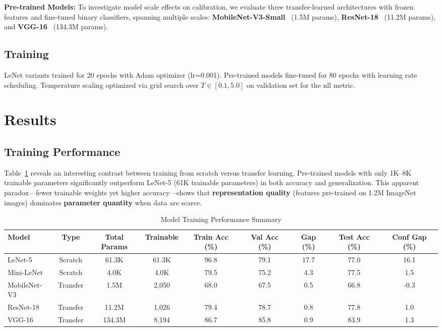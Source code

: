 \documentclass[10pt,twocolumn]{article}
\begin{document}
\textbf{Pre-trained Models:} To investigate model scale effects on calibration, we evaluate three transfer-learned architectures with frozen features and fine-tuned binary classifiers, spanning multiple scales: \textbf{MobileNet-V3-Small}~\cite{howard2019searching} (1.5M params), \textbf{ResNet-18}~\cite{he2016deep} (11.2M params), and \textbf{VGG-16}~\cite{simonyan2014very} (134.3M params).

\subsection{Training}
LeNet variants trained for 20 epochs with Adam optimizer (lr=0.001). Pre-trained models fine-tuned for 80 epochs with learning rate scheduling. Temperature scaling optimized via grid search over $T \in [0.1, 5.0]$ on validation set for the \gls{nll} metric.

\section{Results}
\label{sec:results}

\subsection{Training Performance}

Table~\ref{tab:training_performance} reveals an interesting contrast between training from scratch versus transfer learning. Pre-trained models with only 1K--8K trainable parameters significantly outperform LeNet-5 (61K trainable parameters) in both accuracy and generalization. This apparent paradox—fewer trainable weights yet higher accuracy—shows that \textbf{representation quality} (features pre-trained on 1.2M ImageNet images) dominates \textbf{parameter quantity} when data are scarce.


\begin{table}[t]
\vspace{-0.5em}
\caption{Model Training Performance Summary}\vspace{-0.8em}
\label{tab:training_performance}
\centering
\small
\setlength{\tabcolsep}{5pt}
\renewcommand{\arraystretch}{1.1}
\begin{tabular}{lcccccccc}
\toprule
Model & Type & Total Params & Trainable & Train Acc (\%) & Val Acc (\%) & Gap (\%) & Test Acc (\%) & Conf Gap (\%) \\
\midrule
LeNet-5 & Scratch & 61.3K & 61.3K & 96.8 & 79.1 & 17.7 & 77.0 & 16.1 \\
Mini-LeNet & Scratch & 4.0K & 4.0K & 79.5 & 75.2 & 4.3 & 77.5 & 1.5 \\
MobileNet-V3 & Transfer & 1.5M & 2,050 & 68.0 & 67.5 & 0.5 & 66.8 & -0.3 \\
ResNet-18 & Transfer & 11.2M & 1,026 & 79.4 & 78.7 & 0.8 & 77.8 & 1.0 \\
VGG-16 & Transfer & 134.3M & 8,194 & 86.7 & 85.8 & 0.9 & 83.9 & 1.3 \\
\bottomrule
\end{tabular}
\vspace{-1.5em}
\end{table}
\end{document}
